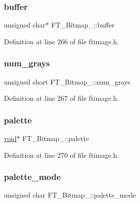 \subsubsection{\texorpdfstring{buffer}{buffer}}
{\footnotesize\ttfamily unsigned char$\ast$ F\+T\+\_\+\+Bitmap\+\_\+\+::buffer}



Definition at line 266 of file ftimage.\+h.

\mbox{\label{struct_f_t___bitmap___a2465f41f8badacca572203c4bdb473e3}} 
\subsubsection{\texorpdfstring{num\_grays}{num\_grays}}
{\footnotesize\ttfamily unsigned short F\+T\+\_\+\+Bitmap\+\_\+\+::num\+\_\+grays}



Definition at line 267 of file ftimage.\+h.

\mbox{\label{struct_f_t___bitmap___a8d5ecf4409f71bfb559e0d13d8df4d86}} 
\subsubsection{\texorpdfstring{palette}{palette}}
{\footnotesize\ttfamily \mbox{\hyperlink{_s_d_l__opengles2__gl2ext_8h_ae5d8fa23ad07c48bb609509eae494c95}{void}}$\ast$ F\+T\+\_\+\+Bitmap\+\_\+\+::palette}



Definition at line 270 of file ftimage.\+h.

\mbox{\label{struct_f_t___bitmap___a46b396401785e1cd90066f9cd11507f6}} 
\subsubsection{\texorpdfstring{palette\_mode}{palette\_mode}}
{\footnotesize\ttfamily unsigned char F\+T\+\_\+\+Bitmap\+\_\+\+::palette\+\_\+mode}



